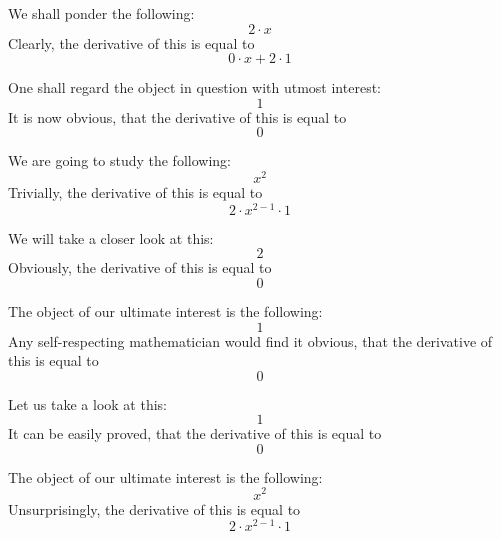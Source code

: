 \documentclass{article}
\begin{document}
We shall ponder the following:
\begin{equation}
2 \cdot x 
\end{equation}
Clearly, the derivative of this is equal to
\begin{equation}
0 \cdot x + 2 \cdot 1 
\end{equation}

One shall regard the object in question with utmost interest:
\begin{equation}
1 
\end{equation}
It is now obvious, that the derivative of this is equal to
\begin{equation}
0 
\end{equation}

We are going to study the following:
\begin{equation}
x ^{2 } 
\end{equation}
Trivially, the derivative of this is equal to
\begin{equation}
2 \cdot x ^{2 - 1 } \cdot 1 
\end{equation}

We will take a closer look at this:
\begin{equation}
2 
\end{equation}
Obviously, the derivative of this is equal to
\begin{equation}
0 
\end{equation}

The object of our ultimate interest is the following:
\begin{equation}
1 
\end{equation}
Any self-respecting mathematician would find it obvious, that the derivative of this is equal to
\begin{equation}
0 
\end{equation}

Let us take a look at this:
\begin{equation}
1 
\end{equation}
It can be easily proved, that the derivative of this is equal to
\begin{equation}
0 
\end{equation}

The object of our ultimate interest is the following:
\begin{equation}
x ^{2 } 
\end{equation}
Unsurprisingly, the derivative of this is equal to
\begin{equation}
2 \cdot x ^{2 - 1 } \cdot 1 
\end{equation}
\end{document}
